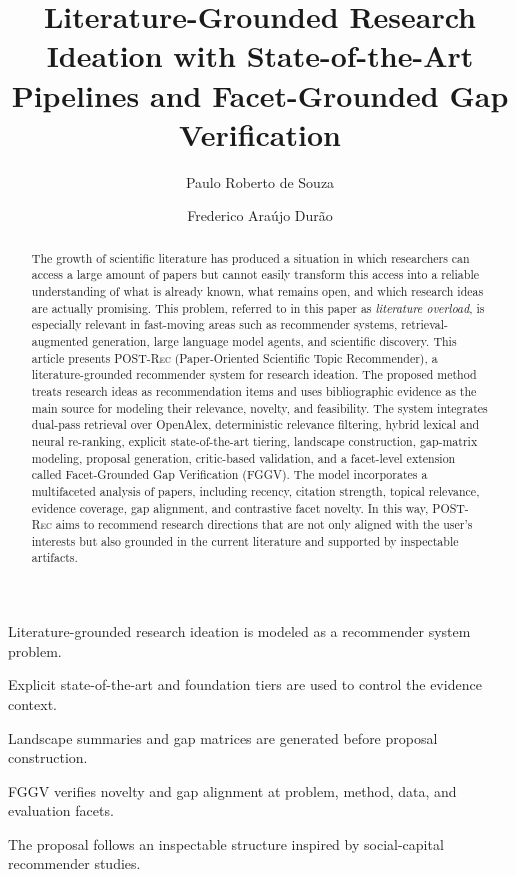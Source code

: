 \documentclass[preprint,12pt]{elsarticle}
\begin{document}
\begin{frontmatter}

\title{Literature-Grounded Research Ideation with State-of-the-Art Pipelines and Facet-Grounded Gap Verification}

\author[ufba]{Paulo Roberto de Souza}

\author[ufba]{Frederico Ara\'{u}jo Dur\~{a}o}


\begin{abstract}
The growth of scientific literature has produced a situation in which researchers can access a large amount of papers but cannot easily transform this access into a reliable understanding of what is already known, what remains open, and which research ideas are actually promising. This problem, referred to in this paper as \emph{literature overload}, is especially relevant in fast-moving areas such as recommender systems, retrieval-augmented generation, large language model agents, and scientific discovery. This article presents \textsc{POST-Rec} (Paper-Oriented Scientific Topic Recommender), a literature-grounded recommender system for research ideation. The proposed method treats research ideas as recommendation items and uses bibliographic evidence as the main source for modeling their relevance, novelty, and feasibility. The system integrates dual-pass retrieval over OpenAlex, deterministic relevance filtering, hybrid lexical and neural re-ranking, explicit state-of-the-art tiering, landscape construction, gap-matrix modeling, proposal generation, critic-based validation, and a facet-level extension called Facet-Grounded Gap Verification (FGGV). The model incorporates a multifaceted analysis of papers, including recency, citation strength, topical relevance, evidence coverage, gap alignment, and contrastive facet novelty. In this way, \textsc{POST-Rec} aims to recommend research directions that are not only aligned with the user's interests but also grounded in the current literature and supported by inspectable artifacts.
\end{abstract}

\begin{highlights}
\item Literature-grounded research ideation is modeled as a recommender system problem.
\item Explicit state-of-the-art and foundation tiers are used to control the evidence context.
\item Landscape summaries and gap matrices are generated before proposal construction.
\item FGGV verifies novelty and gap alignment at problem, method, data, and evaluation facets.
\item The proposal follows an inspectable structure inspired by social-capital recommender studies.
\end{highlights}


\end{frontmatter}
\end{document}
